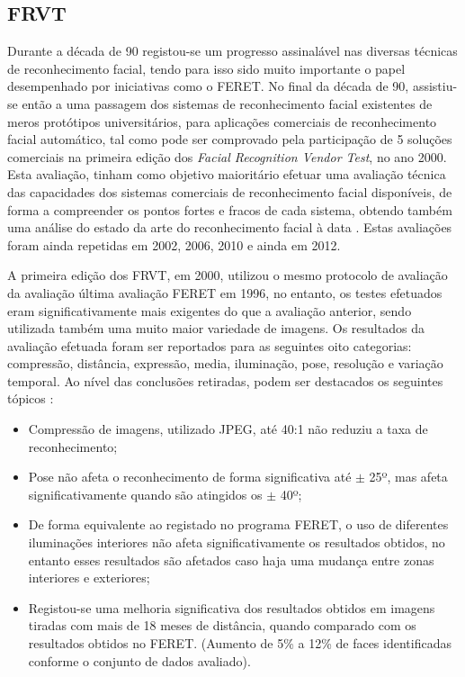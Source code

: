 \subsection{FRVT}
Durante a década de 90 registou-se um progresso assinalável nas diversas técnicas de reconhecimento facial, tendo para isso sido muito importante o papel desempenhado por iniciativas como o FERET. No final da década de 90, assistiu-se então a uma passagem dos sistemas de reconhecimento facial existentes de meros protótipos universitários, para aplicações comerciais de reconhecimento facial automático, tal como pode ser comprovado  pela participação de 5 soluções comerciais na primeira edição dos \textit{Facial Recognition Vendor Test}, no ano 2000. Esta avaliação, tinham como objetivo maioritário efetuar uma avaliação técnica das capacidades dos sistemas comerciais de reconhecimento facial disponíveis, de forma a compreender os pontos fortes e fracos de cada sistema, obtendo também uma análise do estado da arte do reconhecimento facial à data \cite{BlackburnDuaneM.;BoneMike;Phillips2001}. Estas avaliações foram ainda repetidas em 2002, 2006, 2010 e ainda em 2012.

A primeira edição dos FRVT, em 2000, utilizou o mesmo protocolo de avaliação da avaliação última avaliação FERET em 1996, no entanto, os testes efetuados eram significativamente mais exigentes do que a avaliação anterior, sendo utilizada também uma muito maior variedade de imagens. Os resultados da avaliação efetuada foram ser reportados para as seguintes oito categorias: compressão, distância, expressão,  media, iluminação, pose, resolução e variação temporal. Ao nível das conclusões retiradas, podem ser destacados os seguintes tópicos \cite{BlackburnDuaneM.;BoneMike;Phillips2001, Chellappa2010, Li2011}:
\begin{itemize}
\item Compressão de imagens, utilizado JPEG, até 40:1 não reduziu a taxa de reconhecimento;
\item Pose não afeta o reconhecimento de forma significativa até $\pm$ 25º, mas afeta significativamente quando são atingidos os $\pm$ 40º;
\item De forma equivalente ao registado no programa FERET, o uso de diferentes iluminações interiores não afeta significativamente os resultados obtidos, no entanto esses resultados são afetados caso haja uma mudança entre zonas interiores e exteriores;
\item Registou-se uma melhoria significativa dos resultados obtidos em imagens tiradas com mais de 18 meses de distância, quando comparado com os resultados obtidos no FERET. (Aumento de 5\% a 12\% de faces identificadas conforme o conjunto de dados avaliado).
\end{itemize}

